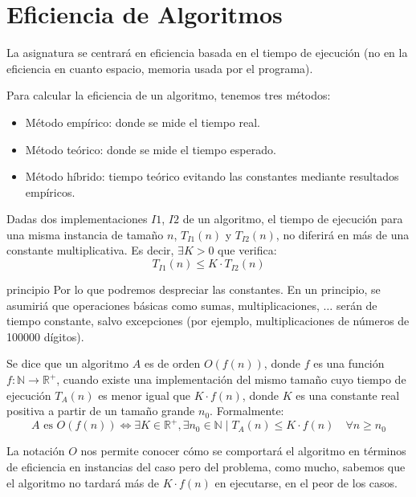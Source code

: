 \chapter{Eficiencia de Algoritmos}
La asignatura se centrará en eficiencia basada en el tiempo de ejecución (no en la eficiencia en cuanto espacio, memoria usada por el programa).

Para calcular la eficiencia de un algoritmo, tenemos tres métodos:
\begin{itemize}
    \item Método empírico: donde se mide el tiempo real.
    \item Método teórico: donde se mide el tiempo esperado.
    \item Método híbrido: tiempo teórico evitando las constantes mediante resultados empíricos.
\end{itemize}

\begin{prop}
Dadas dos implementaciones $I1$, $I2$ de un algoritmo, el tiempo de ejecución para una misma instancia de tamaño $n$, $T_{I1}(n)$ y $T_{I2}(n)$, no diferirá en más de una constante multiplicativa. Es decir, $\exists K > 0$ que verifica: 
\begin{equation*}
T_{I1}(n) \leq K \cdot T_{I2}(n)
\end{equation*}

\end{prop}principio
Por lo que podremos despreciar las constantes.
En un principio, se asumiriá que operaciones básicas como sumas, multiplicaciones, $\ldots$ serán de tiempo constante, salvo excepciones (por ejemplo, multiplicaciones de números de 100000 dígitos).

\begin{definicion}[Notación O]
Se dice que un algoritmo $A$ es de orden $O(f(n))$, donde $f$ es una función $f:\mathbb{N}\rightarrow \mathbb{R}^{+}$, cuando existe una implementación del mismo tamaño cuyo tiempo de ejecución $T_A(n)$ es menor igual que $K \cdot f(n)$, donde $K$ es una constante real positiva a partir de un tamaño grande $n_0$. Formalmente:
\begin{equation*}
A \text{\ es\ } O(f(n)) \Leftrightarrow \exists K \in \mathbb{R}^{+}, \exists n_0 \in \mathbb{N} \mid T_A(n) \leq K \cdot f(n)\quad\forall n \geq n_0
\end{equation*}
\end{definicion}
La notación $O$ nos permite conocer cómo se comportará el algoritmo en términos de eficiencia en instancias del caso pero del problema, como mucho, sabemos que el algoritmo no tardará más de $K \cdot f(n)$ en ejecutarse, en el peor de los casos.

